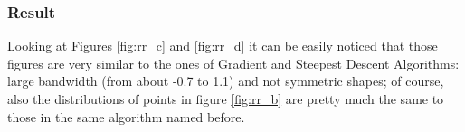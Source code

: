 \documentclass[a4paper,12pt,oneside,titlepage]{article}
\begin{document}
	\subsubsection{Result}
	Looking at Figures \ref{fig:rr_c} and \ref{fig:rr_d} it can be easily noticed that those figures are very similar to the ones of Gradient and Steepest Descent Algorithms: large bandwidth (from about -0.7 to 1.1) and not symmetric shapes; of course, also the distributions of points in figure \ref{fig:rr_b} are pretty much the same to those in the same algorithm named before.
	\begin{figure}[H]
		\centering
		\begin{center}
			\\

\end{center}
\end{figure}
\end{document}
